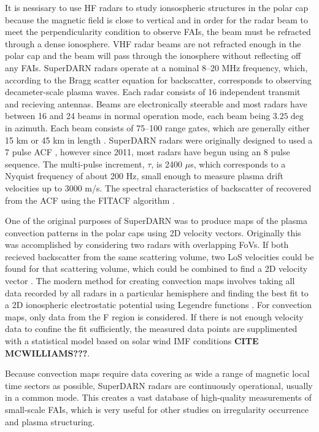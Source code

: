 It is nessisary to use HF radars to study ionsospheric structures in the polar cap because the magnetic field is close to vertical and in order for the radar beam to meet the perpendicularity condition to observe FAIs, the beam must be refracted through a dense ionosphere.  VHF radar beams are not refracted enough in the polar cap and the beam will pass through the ionosphere without reflecting off any FAIs.  SuperDARN radars operate at a nominal 8--20 MHz frequency, which, according to the Bragg scatter equation for backscatter, corresponds to observing decameter-scale plasma waves.  Each radar consists of 16 independent transmit and recieving antennas.  Beams are electronically steerable and most radars have between 16 and 24 beams in normal operation mode, each beam being \(3.25\deg\) in azimuth.  Each beam consists of 75--100 range gates, which are generally either 15 km or 45 km in length \citep{Chisham2007}.  SuperDARN radars were originally designed to used a 7 pulse ACF \citep{Farley1972,Greenwald1983,Greenwald1985}, however since 2011, most radars have begun using an 8 pulse sequence.   The multi-pulse increment, \(\tau\), is 2400 \(\mu\)s, which corresponds to a Nyquist frequency of about 200 Hz, small enough to measure plasma drift velocities up to 3000 m/s.  The spectral characteristics of backscatter of recovered from the ACF using the FITACF algorithm \citep{Ponomarenko2006}.

One of the original purposes of SuperDARN was to produce maps of the plasma convection patterns in the polar caps using 2D velocity vectors.  Originally this was accomplished by considering two radars with overlapping FoVs.  If both recieved backscatter from the same scattering volume, two LoS velocities could be found for that scattering volume, which could be combined to find a 2D velocity vector \citep{Ruohoniemi1989}.  The modern method for creating convection maps involves taking all data recorded by all radars in a particular hemisphere and finding the best fit to a 2D ionospheric electrostatic potential using Legendre functions \citep{Ruohonomiemi1998}.  For convection maps, only data from the F region is considered.  If there is not enough velocity data to confine the fit sufficiently, the measured data points are supplimented with a statistical model based on solar wind IMF conditions \textbf{CITE MCWILLIAMS???}.

Because convection maps require data covering as wide a range of magnetic local time sectors as possible, SuperDARN radars are continuously operational, usually in a common mode.  This creates a vast database of high-quality measurements of small-scale FAIs, which is very useful for other studies on irregularity occurrence and plasma structuring.

